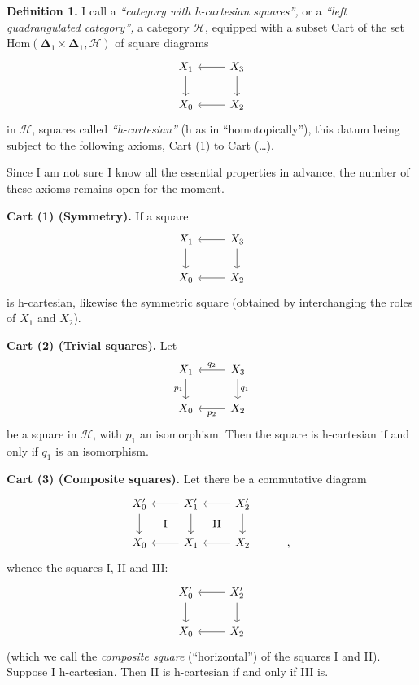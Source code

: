 \documentclass[11pt]{article}
\newcommand{\printedpage}[1]{\marginpar{\footnotesize p.~#1}}
\newcommand{\msp}[1]{\marginpar{\footnotesize [#1]}}
\begin{document}
\noindent\textbf{Definition 1.} I call a \textit{``category with h-cartesian squares'',} or a \textit{``left quadrangulated category'',} a category $\mathcal{H}$, equipped with a subset Cart of the set $\mathrm{Hom}(\boldsymbol{\Delta}_1\times\boldsymbol{\Delta}_1,\mathcal{H})$
\printedpage{2}
of square diagrams
\[
\begin{tikzcd}
X_1 \arrow[d] & X_3 \arrow[l] \arrow[d] \\
X_0 & X_2 \arrow[l]
\end{tikzcd}
\]
in $\mathcal{H}$, squares called \textit{``h-cartesian''} (h as in ``homotopically''), this \msp{page 3} datum being subject to the following axioms, Cart (1) to Cart (\ldots).

\noindent Since I am not sure I know all the essential properties in advance, the number of these axioms remains open for the moment.

\noindent\textbf{Cart (1) (Symmetry).} If a square
\[
\begin{tikzcd}
X_1 \arrow[d] & X_3 \arrow[l] \arrow[d] \\
X_0 & X_2 \arrow[l]
\end{tikzcd}
\]
is h-cartesian, likewise the symmetric square (obtained by interchanging the roles of $X_1$ and $X_2$).

\noindent\textbf{Cart (2) (Trivial squares).} Let
\[
\begin{tikzcd}
X_1 \arrow[d, "p_1"'] & X_3 \arrow[l, "q_2"'] \arrow[d, "q_1"] \\
X_0 & X_2 \arrow[l, "p_2"]
\end{tikzcd}
\]
be a square in $\mathcal{H}$, with $p_1$ an isomorphism. Then the square is h-cartesian if and only if $q_1$ is an isomorphism.

\noindent\textbf{Cart (3) (Composite squares).} Let there be a commutative diagram
\[
\begin{tikzcd}
X'_0 \arrow[d] \arrow[dr, phantom, "\mathrm{I}"] & X'_1 \arrow[l] \arrow[d] \arrow[dr, phantom, "\mathrm{II}"] & X'_2 \arrow[l] \arrow[d] & \\
X_0 & X_1 \arrow[l] & X_2 \arrow[l] & ,
\end{tikzcd}
\]
whence the squares I, II and III:
\[
\begin{tikzcd}
X'_0 \arrow[d] & X'_2 \arrow[l] \arrow[d] \\
X_0 & X_2 \arrow[l]
\end{tikzcd}
\]
\printedpage{3}
(which we call the \textit{composite square} (``horizontal'') of the squares I and II). Suppose I h-cartesian. Then II is h-cartesian if and only if III is.
\end{document}
